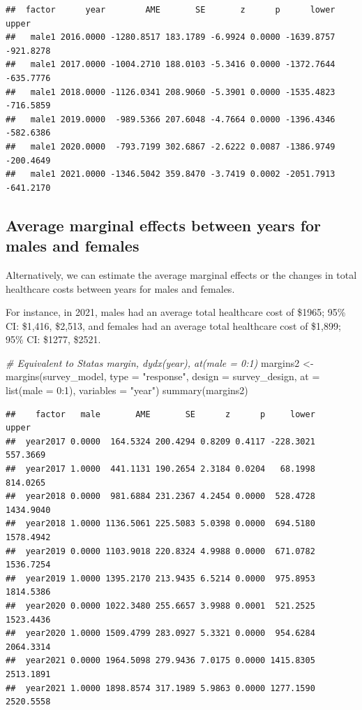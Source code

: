 \documentclass[
]{book}
\newenvironment{Shaded}{\begin{snugshade}}{\end{snugshade}}
\newcommand{\AttributeTok}[1]{\textcolor[rgb]{0.77,0.63,0.00}{#1}}
\newcommand{\CommentTok}[1]{\textcolor[rgb]{0.56,0.35,0.01}{\textit{#1}}}
\newcommand{\DecValTok}[1]{\textcolor[rgb]{0.00,0.00,0.81}{#1}}
\newcommand{\FunctionTok}[1]{\textcolor[rgb]{0.00,0.00,0.00}{#1}}
\newcommand{\NormalTok}[1]{#1}
\newcommand{\OtherTok}[1]{\textcolor[rgb]{0.56,0.35,0.01}{#1}}
\newcommand{\SpecialCharTok}[1]{\textcolor[rgb]{0.00,0.00,0.00}{#1}}
\newcommand{\StringTok}[1]{\textcolor[rgb]{0.31,0.60,0.02}{#1}}
\begin{document}
\begin{verbatim}
##  factor      year        AME       SE       z      p      lower     upper
##   male1 2016.0000 -1280.8517 183.1789 -6.9924 0.0000 -1639.8757 -921.8278
##   male1 2017.0000 -1004.2710 188.0103 -5.3416 0.0000 -1372.7644 -635.7776
##   male1 2018.0000 -1126.0341 208.9060 -5.3901 0.0000 -1535.4823 -716.5859
##   male1 2019.0000  -989.5366 207.6048 -4.7664 0.0000 -1396.4346 -582.6386
##   male1 2020.0000  -793.7199 302.6867 -2.6222 0.0087 -1386.9749 -200.4649
##   male1 2021.0000 -1346.5042 359.8470 -3.7419 0.0002 -2051.7913 -641.2170
\end{verbatim}

\hypertarget{average-marginal-effects-between-years-for-males-and-females}{%
\subsection{Average marginal effects between years for males and females}\label{average-marginal-effects-between-years-for-males-and-females}}

Alternatively, we can estimate the average marginal effects or the changes in total healthcare costs between years for males and females.

For instance, in 2021, males had an average total healthcare cost of \$1965; 95\% CI: \$1,416, \$2,513, and females had an average total healthcare cost of \$1,899; 95\% CI: \$1277, \$2521.

\begin{Shaded}
\begin{Highlighting}[]
\CommentTok{\# Equivalent to Stata\textquotesingle{}s margin, dydx(year), at(male = 0:1)}
\NormalTok{margins2 }\OtherTok{\textless{}{-}} \FunctionTok{margins}\NormalTok{(survey\_model, }\AttributeTok{type =} \StringTok{"response"}\NormalTok{, }\AttributeTok{design =}\NormalTok{ survey\_design, }\AttributeTok{at =} \FunctionTok{list}\NormalTok{(}\AttributeTok{male =} \DecValTok{0}\SpecialCharTok{:}\DecValTok{1}\NormalTok{), }\AttributeTok{variables =} \StringTok{"year"}\NormalTok{)}
\FunctionTok{summary}\NormalTok{(margins2)}
\end{Highlighting}
\end{Shaded}

\begin{verbatim}
##    factor   male       AME       SE      z      p     lower     upper
##  year2017 0.0000  164.5324 200.4294 0.8209 0.4117 -228.3021  557.3669
##  year2017 1.0000  441.1131 190.2654 2.3184 0.0204   68.1998  814.0265
##  year2018 0.0000  981.6884 231.2367 4.2454 0.0000  528.4728 1434.9040
##  year2018 1.0000 1136.5061 225.5083 5.0398 0.0000  694.5180 1578.4942
##  year2019 0.0000 1103.9018 220.8324 4.9988 0.0000  671.0782 1536.7254
##  year2019 1.0000 1395.2170 213.9435 6.5214 0.0000  975.8953 1814.5386
##  year2020 0.0000 1022.3480 255.6657 3.9988 0.0001  521.2525 1523.4436
##  year2020 1.0000 1509.4799 283.0927 5.3321 0.0000  954.6284 2064.3314
##  year2021 0.0000 1964.5098 279.9436 7.0175 0.0000 1415.8305 2513.1891
##  year2021 1.0000 1898.8574 317.1989 5.9863 0.0000 1277.1590 2520.5558
\end{verbatim}
\end{document}
